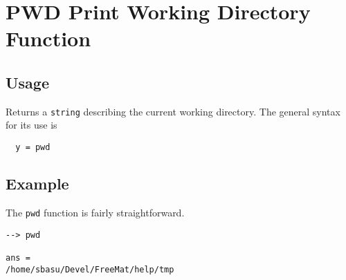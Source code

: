 \section{PWD Print Working Directory Function}

\subsection{Usage}

Returns a \verb|string| describing the current working directory.  The general syntax for its use is
\begin{verbatim}
  y = pwd
\end{verbatim}

\subsection{Example}

The \verb|pwd| function is fairly straightforward.
\begin{verbatim}
--> pwd

ans = 
/home/sbasu/Devel/FreeMat/help/tmp
\end{verbatim}
